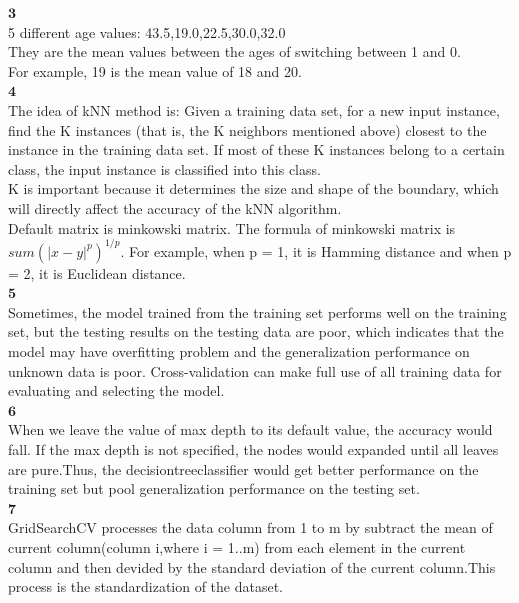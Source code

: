\documentclass[12pt]{article}
\begin{document}
$\textbf{3}$\\

5 different age values: 43.5,19.0,22.5,30.0,32.0\\

They are the mean values between the ages of switching between 1 and 0.\\

For example, 19 is the mean value of 18 and 20.\\

$\textbf{4}$\\

The idea of kNN method is: Given a training data set, for a new input instance, find the K instances (that is, the K neighbors mentioned above) closest to the instance in the training data set. If most of these K instances belong to a certain class, the input instance is classified into this class.\\

K is important because it determines the size and shape of the boundary, which will directly affect the accuracy of the kNN algorithm.\\

Default matrix is minkowski matrix. The formula of minkowski matrix is $sum(|x - y|^p)^{1/p}$. For example, when p = 1, it is Hamming distance and when p = 2, it is Euclidean distance.\\

$\textbf{5}$\\

Sometimes, the model trained from the training set performs well on the training set, but the testing results on the testing data are poor, which indicates that the model may have overfitting problem and the generalization performance on unknown data is poor. Cross-validation can make full use of all training data for evaluating and selecting the model.\\

$\textbf{6}$\\

When we leave the value of max depth to its default value, the accuracy would fall. If the max depth is not specified, the nodes
would expanded until all leaves are pure.Thus, the decisiontreeclassifier
would get better performance on the training set but pool generalization 
performance on the testing set.\\

$\textbf{7}$\\

GridSearchCV processes the data column from 1 to m by subtract the mean of current column(column i,where i = 1..m) from each element in the current column and then devided by the standard deviation of the current column.This process is the standardization of the dataset.\\
\end{document}
